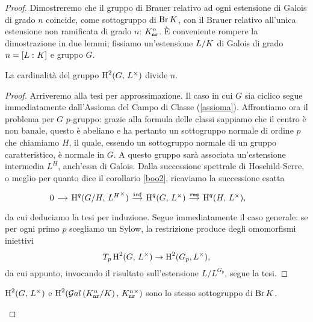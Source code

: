 \begin{proof}
Dimostreremo che il gruppo di Brauer relativo ad ogni estensione di Galois di grado $ n $ coincide, come sottogruppo di $ \operatorname{Br} K $, con il Brauer relativo all'unica estensione non ramificata di grado $ n $: $ K_\mathtt{nr}^n $. È conveniente rompere la dimostrazione in due lemmi;
fissiamo un'estensione $ L/K $ di Galois di grado $ n = [L\,\colon K] $ e gruppo $ G $.

\begin{lemma}\label{Br1}
	La cardinalità del gruppo $ \operatorname{H}^2(G,\, L^\times ) $ divide $ n $.
\end{lemma}

\begin{proof}
	Arriveremo alla tesi per approssimazione. %
	Il caso in cui $ G $ sia ciclico segue immediatamente dall'Assioma del Campo di Classe (\ref{assioma}). Affrontiamo ora il problema per $ G $ $ p $-gruppo: grazie alla formula delle classi sappiamo che il centro è non banale, questo è abeliano e ha pertanto un sottogruppo normale di ordine $ p $ che chiamiamo $ H $, il quale, essendo un sottogruppo normale di un gruppo caratteristico, è normale in $ G $. A questo gruppo sarà associata un'estensione intermedia $ L^H $, anch'essa di Galois. Dalla successione spettrale di Hoschild-Serre, o meglio per quanto dice il corollario \ref{boo2}, ricaviamo la successione esatta
	\[\begin{tikzcd}[column sep = small]
	0 \rar & \HH^q(G/H, \, {L^H}^\times) \rar["\Inf"]
	& \HH^q(G, \, L^\times) \rar["\Res"]
	& \HH^q(H, \, L^\times),
	\end{tikzcd} \qquad  \]
	da cui deduciamo la tesi per induzione. Segue immediatamente il caso generale: se per ogni primo $ p $ scegliamo un Sylow, la restrizione produce degli omomorfismi iniettivi
	\[ T_p\operatorname{H}^2(G, \, L^\times) \to \operatorname{H}^2(G_p, L^\times), \]
	da cui appunto, invocando il risultato sull'estensione $ L/L^{G_p} $, segue la tesi.
\end{proof}

\begin{lemma}\label{br2}
	$ \operatorname{H}^2(G,\, L^\times ) $ e $ \operatorname{H}^2(\mathcal{G}al\left( K_\mathtt{nr}^n/K \right),\, K_\mathtt{nr}^{n\times}) $ sono lo stesso sottogruppo di $ \operatorname{Br} K $.
\end{lemma}


\end{proof}
